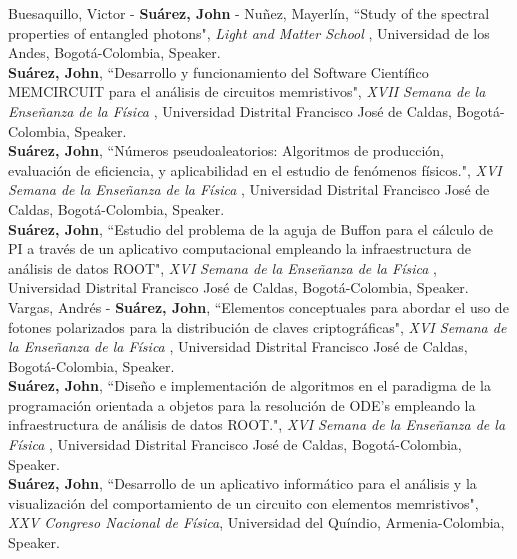 \documentclass[10pt, a4paper]{article}
\newcommand{\years}[1]{\marginnote{\scriptsize #1}}
\begin{document}
\years{2016}Buesaquillo, Victor - \textbf{Suárez, John} - Nuñez, Mayerlín, “Study of the spectral properties of entangled photons", \emph{Light and Matter School }, Universidad de los Andes, Bogotá-Colombia, Speaker.\\

\years{2014}\textbf{Suárez, John}, “Desarrollo y funcionamiento del Software Científico MEMCIRCUIT para el análisis de circuitos memristivos", \emph{XVII Semana de la Enseñanza de la Física }, Universidad Distrital Francisco José de Caldas, Bogotá-Colombia, Speaker.\\

\years{2013}\textbf{Suárez, John}, “Números pseudoaleatorios: Algoritmos de producción, evaluación de eficiencia, y aplicabilidad en el estudio de fenómenos físicos.", \emph{XVI Semana de la Enseñanza de la Física }, Universidad Distrital Francisco José de Caldas, Bogotá-Colombia, Speaker.\\

\years{2013}\textbf{Suárez, John}, “Estudio del problema de la aguja de Buffon para el cálculo de PI a través de un aplicativo computacional empleando la infraestructura de análisis de datos ROOT", \emph{XVI Semana de la Enseñanza de la Física }, Universidad Distrital Francisco José de Caldas, Bogotá-Colombia, Speaker.\\

\years{2013}Vargas, Andrés - \textbf{Suárez, John}, “Elementos conceptuales para abordar el uso de fotones polarizados para la distribución de claves criptográficas", \emph{XVI Semana de la Enseñanza de la Física }, Universidad Distrital Francisco José de Caldas, Bogotá-Colombia, Speaker.\\

\years{2013}\textbf{Suárez, John}, “Diseño e implementación de algoritmos en el paradigma de la programación orientada a objetos para la resolución de ODE's empleando la infraestructura de análisis de datos ROOT.", \emph{XVI Semana de la Enseñanza de la Física }, Universidad Distrital Francisco José de Caldas, Bogotá-Colombia, Speaker.\\

\years{2013}\textbf{Suárez, John}, “Desarrollo de un aplicativo informático para el análisis y la visualización del comportamiento de un circuito con elementos memristivos", \emph{XXV Congreso Nacional de Física}, Universidad del Quíndio, Armenia-Colombia, Speaker.\\

\end{document}
